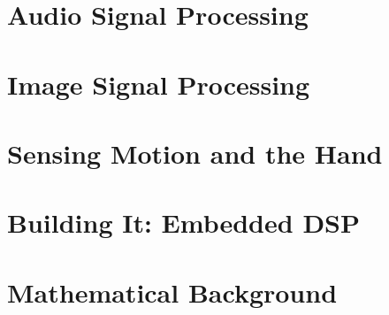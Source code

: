 \documentclass[11pt]{book}
\begin{document}
\part{Audio Signal Processing}





\part{Image Signal Processing}





\part{Sensing Motion and the Hand}







\part{Building It: Embedded DSP}



\part{Mathematical Background}

\end{document}
